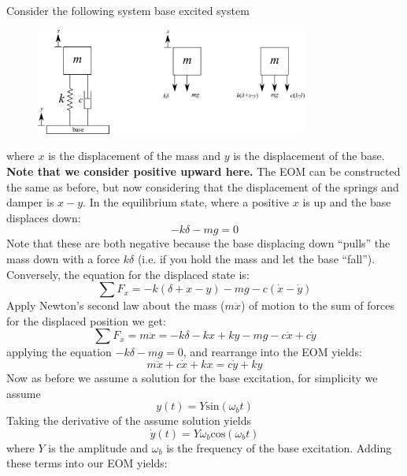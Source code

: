 \documentclass[12pt,a4paper]{article}
\begin{document}
Consider the following system base excited system
\begin{figure}[H]
	\centering
	\includegraphics[width=0.8\textwidth]{../../Figures/base_excited_1_DOF_model_and_FBDs.png}
\end{figure}
where $x$ is the displacement of the mass and $y$ is the displacement of the base. \textbf{Note that we consider positive upward here.} The EOM can be constructed the same as before, but now considering that the displacement of the springs and damper is $x-y$.  In the equilibrium state, where a positive $x$ is up and the base displaces down:
\begin{equation}
-k\delta -mg =0
\end{equation}	
Note that these are both negative because the base displacing down ``pulls'' the mass down with a force $k\delta$ (i.e. if you hold the mass and let the base ``fall''). Conversely, the equation for the displaced state is:
\begin{equation}
\sum F_x = -k(\delta + x - y) -mg -c(\dot{x} -\dot{y})
\end{equation}	
Apply Newton's second law about the mass ($m\ddot{x}$) of motion to the sum of forces for the displaced position we get:
\begin{equation}
\sum F_x = m\ddot{x} = -k\delta -kx + ky -mg -c\dot{x} +c\dot{y}
\end{equation}	
applying the equation $-k\delta -mg =0$, and rearrange into the EOM yields:	
\begin{equation}
m\ddot{x} + c\dot{x} + kx = c\dot{y} + ky 
\end{equation}
Now as before we assume a solution for the base excitation, for simplicity we assume
\begin{equation}
y(t) = Y\text{sin}(\omega_b t)
\end{equation}
Taking the derivative of the assume solution yields
\begin{equation}
\dot{y}(t) = Y \omega_b \text{cos}(\omega_b t)
\end{equation}
where $Y$ is the amplitude and $\omega_b$ is the frequency of the base excitation. Adding these terms into our EOM yields:
\end{document}
